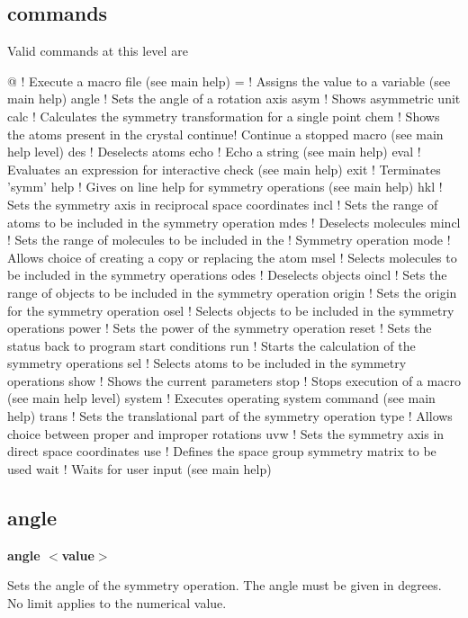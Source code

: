 \subsection*{commands}
Valid commands at this level are 
\par
\begin{MacVerbatim}
@       ! Execute a macro file (see main help)
=       ! Assigns the value to a variable (see main help)
angle   ! Sets the angle of a rotation axis
asym    ! Shows asymmetric unit
calc    ! Calculates the symmetry transformation for a single point
chem    ! Shows the atoms present in the crystal
continue! Continue a stopped macro (see main help level)
des     ! Deselects atoms
echo    ! Echo a string (see main help)
eval    ! Evaluates an expression for interactive check (see main help)
exit    ! Terminates 'symm'
help    ! Gives on line help for symmetry operations (see main help)
hkl     ! Sets the symmetry axis in reciprocal space coordinates
incl    ! Sets the range of atoms to be included in the symmetry operation
mdes    ! Deselects molecules
mincl   ! Sets the range of molecules to be included in the
        ! Symmetry operation
mode    ! Allows choice of creating a copy or replacing the atom
msel    ! Selects molecules to be included in the symmetry operations
odes    ! Deselects objects
oincl   ! Sets the range of objects to be included in the symmetry operation
origin  ! Sets the origin for the symmetry operation
osel    ! Selects objects to be included in the symmetry operations
power   ! Sets the power of the symmetry operation
reset   ! Sets the status back to program start conditions
run     ! Starts the calculation of the symmetry operations
sel     ! Selects atoms to be included in the symmetry operations
show    ! Shows the current parameters
stop    ! Stops execution of a macro (see main help level)
system  ! Executes operating system command (see main help)
trans   ! Sets the translational part of the symmetry operation
type    ! Allows choice between proper and improper rotations
uvw     ! Sets the symmetry axis in direct space coordinates
use     ! Defines the space group symmetry matrix to be used
wait    ! Waits for user input (see main help)
\end{MacVerbatim}
\subsection*{angle}
{\bf angle $ <$value$> $ \par }
\par
\vspace{3pt}
Sets the angle of the symmetry operation. The angle must be given in 
degrees. No limit applies to the numerical value. 
